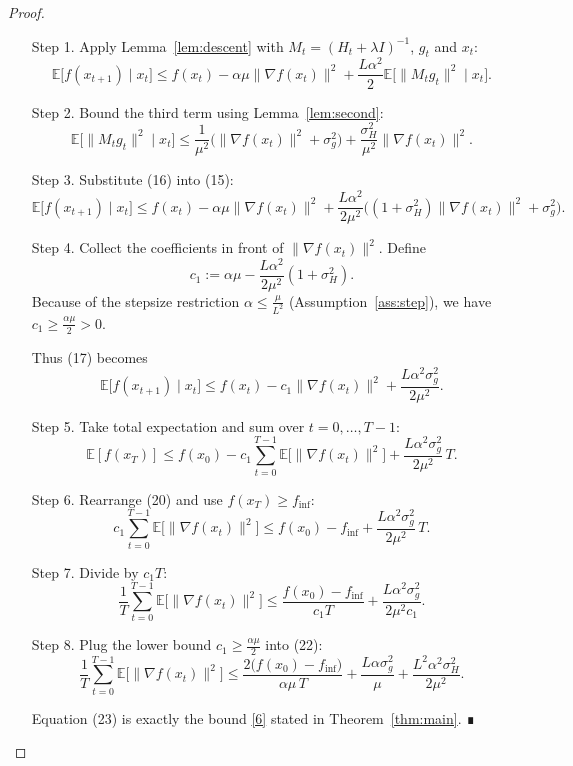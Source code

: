 \documentclass{article}
\newcommand{\E}{\mathbb{E}}
\begin{document}
\begin{proof}
\begin{enumerate}
\item[Step 1.] Apply Lemma~\ref{lem:descent} with $M_t=(H_t+\lambda I)^{-1}$, $g_t$ and $x_t$:
\[
\E\!\big[f(x_{t+1})\mid x_t\big]
\le
f(x_t)-\alpha\mu\|\nabla f(x_t)\|^{2}
+\frac{L\alpha^{2}}{2}\E\!\big[\|M_t g_t\|^{2}\mid x_t\big].
\tag{15}
\]

\item[Step 2.] Bound the third term using Lemma~\ref{lem:second}:
\[
\E\!\big[\|M_t g_t\|^{2}\mid x_t\big]
\le
\frac{1}{\mu^{2}}\Big(\|\nabla f(x_t)\|^{2}+\sigma_{g}^{2}\Big)
+\frac{\sigma_{H}^{2}}{\mu^{2}}\|\nabla f(x_t)\|^{2}.
\tag{16}
\]

\item[Step 3.] Substitute (16) into (15):
\[
\E\!\big[f(x_{t+1})\mid x_t\big]
\le
f(x_t)-\alpha\mu\|\nabla f(x_t)\|^{2}
+\frac{L\alpha^{2}}{2\mu^{2}}\Big((1+\sigma_{H}^{2})\|\nabla f(x_t)\|^{2}
+\sigma_{g}^{2}\Big).
\tag{17}
\]

\item[Step 4.] Collect the coefficients in front of $\|\nabla f(x_t)\|^{2}$.
Define
\[
c_1:=\alpha\mu-\frac{L\alpha^{2}}{2\mu^{2}}(1+\sigma_{H}^{2}).
\tag{18}
\]
Because of the stepsize restriction $\alpha\le\frac{\mu}{L^{2}}$ (Assumption~\ref{ass:step}), we have $c_1\ge\frac{\alpha\mu}{2}>0$.

Thus (17) becomes
\[
\E\!\big[f(x_{t+1})\mid x_t\big]
\le
f(x_t)-c_1\|\nabla f(x_t)\|^{2}
+\frac{L\alpha^{2}\sigma_{g}^{2}}{2\mu^{2}}.
\tag{19}
\]

\item[Step 5.] Take total expectation and sum over $t=0,\dots,T-1$:
\[
\E[f(x_T)]\le f(x_0)-c_1\sum_{t=0}^{T-1}\E\!\big[\|\nabla f(x_t)\|^{2}\big]
+\frac{L\alpha^{2}\sigma_{g}^{2}}{2\mu^{2}}\,T.
\tag{20}
\]

\item[Step 6.] Rearrange (20) and use $f(x_T)\ge f_{\inf}$:
\[
c_1\sum_{t=0}^{T-1}\E\!\big[\|\nabla f(x_t)\|^{2}\big]
\le
f(x_0)-f_{\inf}
+\frac{L\alpha^{2}\sigma_{g}^{2}}{2\mu^{2}}\,T.
\tag{21}
\]

\item[Step 7.] Divide by $c_1T$:
\[
\frac{1}{T}\sum_{t=0}^{T-1}\E\!\big[\|\nabla f(x_t)\|^{2}\big]
\le
\frac{f(x_0)-f_{\inf}}{c_1 T}
+\frac{L\alpha^{2}\sigma_{g}^{2}}{2\mu^{2}c_1}.
\tag{22}
\]

\item[Step 8.] Plug the lower bound $c_1\ge\frac{\alpha\mu}{2}$ into (22):
\[
\frac{1}{T}\sum_{t=0}^{T-1}\E\!\big[\|\nabla f(x_t)\|^{2}\big]
\le
\frac{2\big(f(x_0)-f_{\inf}\big)}{\alpha\mu\,T}
+\frac{L\alpha\sigma_{g}^{2}}{\mu}
+\frac{L^{2}\alpha^{2}\sigma_{H}^{2}}{2\mu^{2}}.
\tag{23}
\]

Equation (23) is exactly the bound \eqref{6} stated in Theorem~\ref{thm:main}. ∎
\end{enumerate}
\end{proof}
\end{document}
